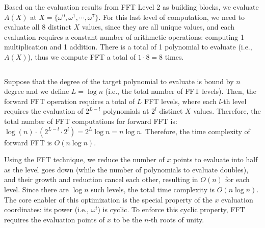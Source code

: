 $ $

 Based on the evaluation results from FFT Level 2 as building blocks, we evaluate $A(X)$ at $X = \{\omega^0, \omega^1, \cdots, \omega^7\}$. For this last level of computation, we need to evaluate all 8 distinct $X$ values, since they are all unique values, and each evaluation requires a constant number of arithmetic operations: computing 1 multiplication and 1 addition. There is a total of 1 polynomial to evaluate (i.e., $A(X)$), thus we compute FFT a total of $1 \cdot 8 = 8$ times. 

$ $

 Suppose that the degree of the target polynomial to evaluate is bound by $n$ degree and we define $L = \log n$ (i.e., the total number of FFT levels). Then, the forward FFT operation requires a total of $L$ FFT levels, where each $l$-th level requires the evaluation of $2^{L - l}$ polynomials at $2^l$ distinct $X$ values. Therefore, the total number of FFT computations for forward FFT is: $\log (n) \cdot (2^{L - l} \cdot 2^l) = 2^L \log n = n \log n$. Therefore, the time complexity of forward FFT is $O(n \log n)$.

Using the FFT technique, we reduce the number of $x$ points to evaluate into half as the level goes down (while the number of polynomials to evaluate doubles), and their growth and reduction cancel each other, resulting in $O(n)$ for each level. Since there are $\log n$ such levels, the total time complexity is $O(n \log n)$. The core enabler of this optimization is the special property of the $x$ evaluation coordinates: its power (i.e., $\omega^i$) is cyclic. To enforce this cyclic property, FFT requires the evaluation points of $x$ to be the $n$-th roots of unity. 


